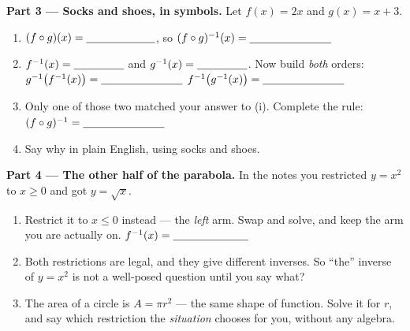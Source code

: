 \documentclass[10pt]{article}
\begin{document}
\begin{tcolorbox}[colback=white, colframe=black!40, title=\textbf{Tier E --- Extension},
    fonttitle=\bfseries, arc=1.5mm, left=3mm, right=3mm, top=2mm, bottom=2mm, breakable]
\vspace{4pt}
\textbf{Part 3 --- Socks and shoes, in symbols.} Let $f(x)=2x$ and $g(x)=x+3$.
\begin{enumerate}[label=(\alph*), leftmargin=1.9em, itemsep=6pt, start=9]
  \item $(f\circ g)(x)=\blank{2.2cm}$, \; so $(f\circ g)^{-1}(x)=\blank{2.6cm}$
  \item $f^{-1}(x)=\blank{1.6cm}$ and $g^{-1}(x)=\blank{1.6cm}$. Now build \emph{both} orders: \\[3pt]
        $g^{-1}\big(f^{-1}(x)\big)=\blank{2.6cm}$ \hspace{0.3in}
        $f^{-1}\big(g^{-1}(x)\big)=\blank{2.6cm}$
  \item Only one of those two matched your answer to (i). Complete the rule:
        $(f\circ g)^{-1}=\blank{2.6cm}$
  \item Say why in plain English, using socks and shoes. 
\end{enumerate}

\vspace{4pt}
\textbf{Part 4 --- The other half of the parabola.} In the notes you restricted $y=x^{2}$ to
$x\ge0$ and got $y=\sqrt{x}$.
\begin{enumerate}[label=(\alph*), leftmargin=1.9em, itemsep=5pt, start=13]
  \item Restrict it to $x\le0$ instead --- the \emph{left} arm. Swap and solve, and keep the arm you
        are actually on. \; $f^{-1}(x)=\blank{2.4cm}$
        \vspace{0.30in}
  \item Both restrictions are legal, and they give different inverses. So ``the'' inverse of
        $y=x^{2}$ is not a well-posed question until you say what? \blank{4.6cm}
  \item The area of a circle is $A=\pi r^{2}$ --- the same shape of function. Solve it for $r$, and
        say which restriction the \emph{situation} chooses for you, without any algebra.
\end{enumerate}
\end{tcolorbox}
\end{document}
